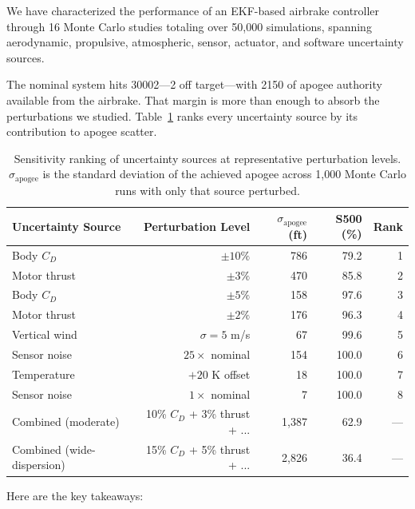 \documentclass[11pt,letterpaper]{article}
\newcommand{\Cd}{C_D}
\begin{document}
We have characterized the performance of an EKF-based airbrake controller through 16 Monte Carlo studies totaling over 50{,}000 simulations, spanning aerodynamic, propulsive, atmospheric, sensor, actuator, and software uncertainty sources.

The nominal system hits \SI{30002}{\ft}---\SI{2}{\ft} off target---with \SI{2150}{\ft} of apogee authority available from the airbrake. That margin is more than enough to absorb the perturbations we studied. Table~\ref{tab:sensitivity_ranking} ranks every uncertainty source by its contribution to apogee scatter.

\begin{table}[H]
\centering
\caption{Sensitivity ranking of uncertainty sources at representative perturbation levels. $\sigma_{\mathrm{apogee}}$ is the standard deviation of the achieved apogee across 1{,}000 Monte Carlo runs with only that source perturbed.}
\label{tab:sensitivity_ranking}
\begin{tabular}{@{}lrrrr@{}}
\toprule
\textbf{Uncertainty Source} & \textbf{Perturbation Level} & \textbf{$\sigma_{\mathrm{apogee}}$ (ft)} & \textbf{S500 (\%)} & \textbf{Rank} \\
\midrule
Body $\Cd$ & $\pm 10\%$ & 786 & 79.2 & 1 \\
Motor thrust & $\pm 3\%$ & 470 & 85.8 & 2 \\
Body $\Cd$ & $\pm 5\%$ & 158 & 97.6 & 3 \\
Motor thrust & $\pm 2\%$ & 176 & 96.3 & 4 \\
Vertical wind & $\sigma = 5$ m/s & 67 & 99.6 & 5 \\
Sensor noise & $25\times$ nominal & 154 & 100.0 & 6 \\
Temperature & $+20$ K offset & 18 & 100.0 & 7 \\
Sensor noise & $1\times$ nominal & 7 & 100.0 & 8 \\
\midrule
Combined (moderate) & 10\% $\Cd$ + 3\% thrust + ... & 1{,}387 & 62.9 & --- \\
Combined (wide-dispersion) & 15\% $\Cd$ + 5\% thrust + ... & 2{,}826 & 36.4 & --- \\
\bottomrule
\end{tabular}
\end{table}

Here are the key takeaways:
\end{document}

